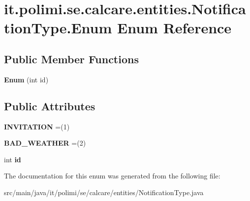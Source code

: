 \hypertarget{enumit_1_1polimi_1_1se_1_1calcare_1_1entities_1_1NotificationType_1_1Enum}{}\section{it.\+polimi.\+se.\+calcare.\+entities.\+Notification\+Type.\+Enum Enum Reference}
\label{enumit_1_1polimi_1_1se_1_1calcare_1_1entities_1_1NotificationType_1_1Enum}
\subsection*{Public Member Functions}
\begin{DoxyCompactItemize}
\item 
\hypertarget{enumit_1_1polimi_1_1se_1_1calcare_1_1entities_1_1NotificationType_1_1Enum_ae1d9ef339458399ebe409ab70061709e}{}{\bfseries Enum} (int id)\label{enumit_1_1polimi_1_1se_1_1calcare_1_1entities_1_1NotificationType_1_1Enum_ae1d9ef339458399ebe409ab70061709e}

\end{DoxyCompactItemize}
\subsection*{Public Attributes}
\begin{DoxyCompactItemize}
\item 
\hypertarget{enumit_1_1polimi_1_1se_1_1calcare_1_1entities_1_1NotificationType_1_1Enum_a024e3ae1725b727ecec210fa3eef3b53}{}{\bfseries I\+N\+V\+I\+T\+A\+T\+I\+O\+N} =(1)\label{enumit_1_1polimi_1_1se_1_1calcare_1_1entities_1_1NotificationType_1_1Enum_a024e3ae1725b727ecec210fa3eef3b53}

\item 
\hypertarget{enumit_1_1polimi_1_1se_1_1calcare_1_1entities_1_1NotificationType_1_1Enum_aaa8ae588a5c0cd41cb0e2a6be0a82d03}{}{\bfseries B\+A\+D\+\_\+\+W\+E\+A\+T\+H\+E\+R} =(2)\label{enumit_1_1polimi_1_1se_1_1calcare_1_1entities_1_1NotificationType_1_1Enum_aaa8ae588a5c0cd41cb0e2a6be0a82d03}

\item 
\hypertarget{enumit_1_1polimi_1_1se_1_1calcare_1_1entities_1_1NotificationType_1_1Enum_ad0924c9dceea31e3ac66b0b01559093b}{}int {\bfseries id}\label{enumit_1_1polimi_1_1se_1_1calcare_1_1entities_1_1NotificationType_1_1Enum_ad0924c9dceea31e3ac66b0b01559093b}

\end{DoxyCompactItemize}


The documentation for this enum was generated from the following file\+:\begin{DoxyCompactItemize}
\item 
src/main/java/it/polimi/se/calcare/entities/Notification\+Type.\+java\end{DoxyCompactItemize}
